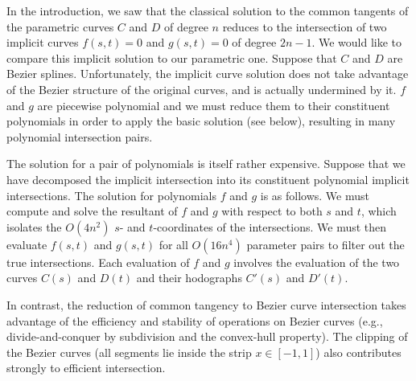 \documentclass[9pt,twocolumn]{article}
\begin{document}
In the introduction, we saw that the classical solution to the common tangents
of the parametric curves $C$ and $D$ of degree $n$
reduces to the intersection of two implicit curves $f(s,t)=0$ and $g(s,t)=0$
of degree $2n-1$.
We would like to compare this implicit solution to our parametric one.
Suppose that $C$ and $D$ are Bezier splines.
Unfortunately, the implicit curve solution does not take advantage
of the Bezier structure of the original curves,
and is actually undermined by it.
$f$ and $g$ are piecewise polynomial and 
we must reduce them to their constituent polynomials in order
to apply the basic solution (see below), resulting
in many polynomial intersection pairs.

The solution for a pair of polynomials is itself rather expensive.
Suppose that we have decomposed the implicit intersection into
its constituent polynomial implicit intersections.
The solution for polynomials $f$ and $g$ is as follows.
We must compute and solve the resultant of $f$ and $g$
with respect to both $s$ and $t$, which isolates the $O(4n^2)$ $s$- and 
$t$-coordinates of the intersections.
We must then evaluate $f(s,t)$ and $g(s,t)$ for all $O(16n^4)$ parameter pairs
to filter out the true intersections.
Each evaluation of $f$ and $g$ involves the evaluation of 
the two curves $C(s)$ and $D(t)$ and their hodographs $C'(s)$ and $D'(t)$.

In contrast, the reduction of common tangency to Bezier curve intersection
takes advantage of the efficiency and stability of operations 
on Bezier curves (e.g., divide-and-conquer by subdivision and the convex-hull
property).
The clipping of the Bezier curves (all segments lie inside the strip 
$x \in [-1,1]$) also contributes strongly to efficient intersection.
\end{document}
